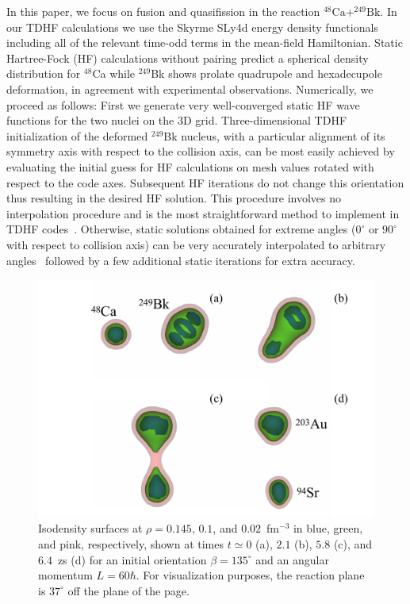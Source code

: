 In this paper, we focus on fusion and quasifission in the reaction
$^{48}\mathrm{Ca}+^{249}\mathrm{Bk}$. In our TDHF calculations
we use the Skyrme SLy4d energy density functionals~\citep{kim1997}
including all of the relevant time-odd terms in the mean-field Hamiltonian.
Static Hartree-Fock (HF) calculations without pairing predict a spherical
density distribution for $^{48}$Ca while $^{249}$Bk shows prolate quadrupole
and hexadecupole deformation, in agreement with experimental observations.
Numerically, we proceed as follows: First we generate very well-converged static
HF wave functions for the two nuclei on the 3D grid.
Three-dimensional TDHF initialization of the deformed $^{249}$Bk nucleus, with a particular alignment of its symmetry
axis with respect to the collision axis, can be most easily achieved by
evaluating the initial guess for HF calculations
on mesh values rotated with respect to the code axes. Subsequent HF iterations do not change this
orientation thus resulting in the desired HF solution. This procedure involves no interpolation
procedure and is the most straightforward method to implement in TDHF codes~\citep{pigg2014}.
Otherwise, static solutions obtained for extreme angles ($0^{\circ}$ or $90^{\circ}$ with respect to collision
axis) can be very accurately interpolated to arbitrary angles~\citep{pigg2014} followed by a few additional static iterations for extra accuracy.
\begin{figure}
	\includegraphics*[width=\textwidth]{../Figures/CaBk/densities.pdf}
	\caption{Isodensity surfaces at $\rho=0.145$, $0.1$, and $0.02$~fm$^{-3}$ in blue, green, and pink, respectively, shown at times $t\simeq0$ (a), $2.1$ (b), $5.8$ (c), and $6.4$~zs (d) for an initial orientation $\beta=135^{\circ}$ and an angular momentum $L=60\hbar$. For visualization purposes, the reaction plane  is $37^{\circ}$ off the plane of the page.}
	\label{fig:density}
\end{figure}

